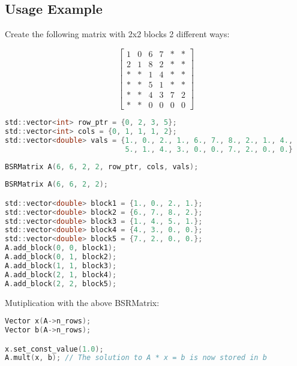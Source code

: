 \documentclass{article}
\newcommand{\bbm}{\begin{bmatrix}}
\newcommand{\ebm}{\end{bmatrix}}
\begin{document}
\subsection*{Usage Example}

Create the following matrix with 2x2 blocks 2 different ways:

\begin{equation*}
    \bbm 1 & 0 & 6 & 7 & * & * \\
         2 & 1 & 8 & 2 & * & * \\
         * & * & 1 & 4 & * & * \\
         * & * & 5 & 1 & * & * \\
         * & * & 4 & 3 & 7 & 2 \\
         * & * & 0 & 0 & 0 & 0 \ebm
\end{equation*}

\begin{lstlisting}[language=C,label=lst:bsr_mat1,caption=Creating a BSRMatrix]
std::vector<int> row_ptr = {0, 2, 3, 5};
std::vector<int> cols = {0, 1, 1, 1, 2};
std::vector<double> vals = {1., 0., 2., 1., 6., 7., 8., 2., 1., 4.,
                            5., 1., 4., 3., 0., 0., 7., 2., 0., 0.}
                            
BSRMatrix A(6, 6, 2, 2, row_ptr, cols, vals);
\end{lstlisting}

\begin{lstlisting}[language=C,label=lst:bsr_mat1,caption=Creating a BSRMatrix]
BSRMatrix A(6, 6, 2, 2);

std::vector<double> block1 = {1., 0., 2., 1.};
std::vector<double> block2 = {6., 7., 8., 2.};
std::vector<double> block3 = {1., 4., 5., 1.};
std::vector<double> block4 = {4., 3., 0., 0.};
std::vector<double> block5 = {7., 2., 0., 0.};
A.add_block(0, 0, block1);
A.add_block(0, 1, block2);
A.add_block(1, 1, block3);
A.add_block(2, 1, block4);
A.add_block(2, 2, block5);
\end{lstlisting}

Mutiplication with the above BSRMatrix:

\begin{lstlisting}[language=C,label=lst:bsr_mat1,caption=Multiplication with a BSRMatrix]
Vector x(A->n_rows);
Vector b(A->n_rows);

x.set_const_value(1.0);
A.mult(x, b); // The solution to A * x = b is now stored in b

\end{lstlisting}
\end{document}
